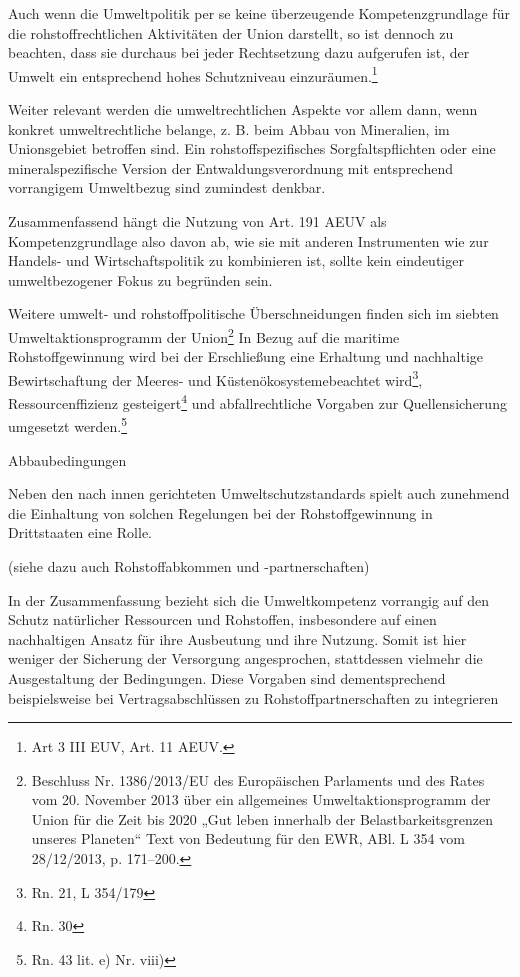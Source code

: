 \documentclass[12pt,a4paper,oneside]{book} %
\begin{document}
Auch wenn die Umweltpolitik per se keine überzeugende Kompetenzgrundlage für die rohstoffrechtlichen Aktivitäten der Union darstellt, so ist dennoch zu beachten, dass sie durchaus bei jeder Rechtsetzung dazu aufgerufen ist, der Umwelt ein entsprechend hohes Schutzniveau einzuräumen.\footnote{Art 3 III EUV, Art. 11 AEUV.}
	
Weiter relevant werden die umweltrechtlichen Aspekte vor allem dann, wenn konkret umweltrechtliche belange, z. B. beim Abbau von Mineralien, im Unionsgebiet betroffen sind. Ein rohstoffspezifisches Sorgfaltspflichten oder eine mineralspezifische Version der Entwaldungsverordnung mit entsprechend vorrangigem Umweltbezug sind zumindest denkbar.
	
Zusammenfassend hängt die Nutzung von Art. 191 AEUV als Kompetenzgrundlage also davon ab, wie sie mit anderen Instrumenten wie zur Handels- und Wirtschaftspolitik zu kombinieren ist, sollte kein eindeutiger umweltbezogener Fokus zu begründen sein.

Weitere umwelt- und rohstoffpolitische Überschneidungen finden sich im siebten Umweltaktionsprogramm der Union\footnote{Beschluss Nr. 1386/2013/EU des Europäischen Parlaments und des Rates vom 20. November 2013 über ein allgemeines Umweltaktionsprogramm der Union für die Zeit bis 2020 „Gut leben innerhalb der Belastbarkeitsgrenzen unseres Planeten“ Text von Bedeutung für den EWR, ABl. L 354 vom 28/12/2013, p. 171–200.} In Bezug auf die maritime Rohstoffgewinnung wird bei der Erschließung eine \glqq Erhaltung und nachhaltige Bewirtschaftung der Meeres- und Küstenökosysteme\glqq beachtet wird\footnote{Rn. 21, L 354/179}, Ressourcenffizienz gesteigert\footnote{Rn. 30} und abfallrechtliche Vorgaben zur Quellensicherung umgesetzt werden.\footnote{Rn. 43 lit. e) Nr. viii)}

Abbaubedingungen

Neben den nach innen gerichteten Umweltschutzstandards spielt auch zunehmend die Einhaltung von solchen Regelungen bei der Rohstoffgewinnung in Drittstaaten eine Rolle.\autocite{Schorkopf, Rohstoffverwaltung, Rn. 30}

(siehe dazu auch Rohstoffabkommen und -partnerschaften)
	


In der Zusammenfassung bezieht sich die Umweltkompetenz vorrangig auf den Schutz natürlicher Ressourcen und Rohstoffen, insbesondere auf einen nachhaltigen Ansatz für ihre Ausbeutung und ihre Nutzung. Somit ist hier weniger der Sicherung der Versorgung angesprochen, stattdessen vielmehr die Ausgestaltung der Bedingungen. Diese Vorgaben sind dementsprechend beispielsweise bei Vertragsabschlüssen zu Rohstoffpartnerschaften zu integrieren
	
\end{document}
